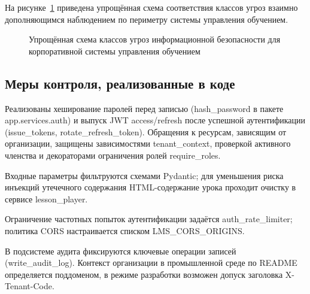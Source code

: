 На рисунке~\ref{fig:ch3-threat-model} приведена упрощённая схема соответствия классов угроз взаимно дополняющимся наблюдением по периметру системы управления обучением.

\begin{figure}[H]
\centering
{}
\caption{Упрощённая схема классов угроз информационной безопасности для корпоративной системы управления обучением}
\label{fig:ch3-threat-model}
\end{figure}

\subsection{Меры контроля, реализованные в коде}

Реализованы хеширование паролей перед записью (hash\_password в пакете app.services.auth) и выпуск JWT access/refresh после успешной аутентификации (issue\_tokens, rotate\_refresh\_token). Обращения к ресурсам, зависящим от организации, защищены зависимостями tenant\_context, проверкой активного членства и декораторами ограничения ролей require\_roles.

Входные параметры фильтруются схемами Pydantic; для уменьшения риска инъекций утечечного содержания HTML-содержание урока проходит очистку в сервисе lesson\_player.

Ограничение частотных попыток аутентификации задаётся auth\_rate\_limiter; политика CORS настраивается списком LMS\_CORS\_ORIGINS.

В подсистеме аудита фиксируются ключевые операции записей (write\_audit\_log). Контекст организации в промышленной среде по README определяется поддоменом, в режиме разработки возможен допуск заголовка X-Tenant-Code.

